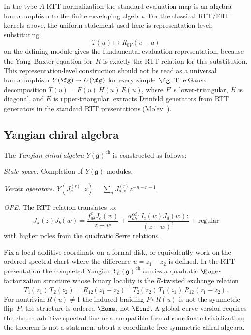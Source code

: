 \begin{remark}
\label{rem:evaluation-gauss}
In the type-$A$ RTT normalization the standard evaluation map is an
algebra homomorphism to the finite enveloping algebra.  For the
classical RTT/FRT kernels above, the uniform statement used here is
representation-level: substituting
\[
        T(u)\longmapsto R_{0V}(u-a)
\]
on the defining module gives the fundamental evaluation representation,
because the Yang--Baxter equation for~$R$ is exactly the RTT relation
for this substitution.  This representation-level construction should
not be read as a universal homomorphism
$Y(\fg)\to U(\fg)$ for every simple~$\fg$.  The Gauss decomposition
$T(u) = F(u)\, H(u)\, E(u)$, where $F$ is lower-triangular, $H$ is
diagonal, and $E$ is upper-triangular, extracts Drinfeld generators
from RTT generators in the standard RTT presentations
\textup{(}Molev~\cite[\S2.5]{molev-yangians}\textup{)}.
\end{remark}

\subsection{Yangian chiral algebra}

\begin{construction}\label{constr:yangian-va}
The \emph{Yangian chiral algebra} $Y(\mathfrak{g})^{\mathrm{ch}}$ is constructed as follows:

\emph{State space.} Completion of $Y(\mathfrak{g})$-modules.

\emph{Vertex operators.} $Y(J^{(r)}_a, z) = \sum_n J^{(r)}_{a,n} z^{-n-r-1}$.

\emph{OPE.} The RTT relation translates to:
\[
J_a(z) J_b(w) = \frac{f_{ab}^c J_c(w)}{z - w} + \frac{\alpha_{ab}^{cd} {:}J_c(w) J_d(w){:}}{(z-w)^2} + \text{regular}
\]
with higher poles from the quadratic Serre relations.
\end{construction}

\begin{theorem}\label{thm:yangian-e1}
Fix a local additive coordinate on a formal disk, or equivalently work
on the ordered spectral chart where the difference
$u=z_1-z_2$ is defined.  In the RTT presentation the completed
Yangian $Y_\hbar(\mathfrak{g})^{\mathrm{ch}}$ carries a quadratic
$\Eone$-factorization structure whose binary locality is the
$R$-twisted exchange relation
\begin{equation}\label{eq:r-twisted-locality}
T_1(z_1)\,T_2(z_2)
=R_{12}(z_1-z_2)^{-1}\,T_2(z_2)\,T_1(z_1)\,
R_{12}(z_1-z_2).
\end{equation}
For nontrivial $R(u) \neq 1$ the induced braiding
$P\circ R(u)$ is not the symmetric flip~$P$; the structure is
ordered $\Eone$, not $\Einf$.  A global curve version requires the
chosen additive spectral line or a compatible formal-coordinate
trivialization; the theorem is not a statement about a coordinate-free
symmetric chiral algebra.
\end{theorem}

